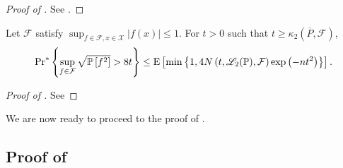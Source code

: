 \begin{proof}[Proof of ]
See .
\end{proof}

\begin{lemma}
\label{lem--sqrt-ep-2nd-moment-sup-pbound}
Let \(\mathcal{F}\) satisfy \(\sup_{f \in \mathcal{F}, x \in \mathcal{X}} |f
(x)| \leq 1\).
For \(t > 0\) such that \(t \geq \kappa_{2} \left( \overline{P}, \mathcal{F}
\right)\),
\begin{equation}
  \mathrm{Pr}^{\ast} \left\{ \sup_{f \in \mathcal{F}} \sqrt{\mathbb{P} \left[ f^{2}
  \right]} > 8 t \right\} \leq \mathrm{E} \left[\min \left\{ 1, 4 N \left( t,
  \mathscr{L}_{2} (\mathbb{P}), \mathcal{F} \right) \exp \left( - n t^{2}
  \right) \right\} \right].
  \label{eqn--sqrt-ep-2nd-moment-sup-pbound}
\end{equation}
\end{lemma}

\begin{proof}[Proof of ]
See
\end{proof}


We are now ready to proceed to the proof of .

\subsection{Proof of \texorpdfstring{}{Theorem
\ref{thm--ep-prob-ineq-no-chain}}}

